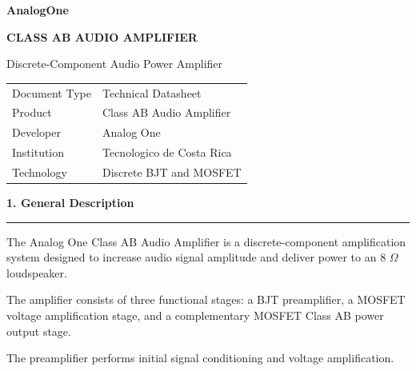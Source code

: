 \documentclass[10pt,letterpaper]{article}
\newcommand{\datasheetsection}[1]{
    \vspace{0.3cm}
    {\large\bfseries\color{datasheetblue}#1}
    \par\vspace{0.1cm}
    \hrule
    \vspace{0.15cm}
}
\begin{document}
\begin{center}

{\Large\bfseries\color{datasheetblue}
AnalogOne}

\vspace{0.3cm}

{\Huge\bfseries
CLASS AB AUDIO AMPLIFIER}

\vspace{0.2cm}

{\large
Discrete-Component Audio Power Amplifier}

\vspace{0.4cm}


\end{center}

\vspace{0.5cm}

\begin{tabular}{ll}
\hline
Document Type & Technical Datasheet\\
Product & Class AB Audio Amplifier\\
Developer & Analog One\\
Institution & Tecnologico de Costa Rica\\
Technology & Discrete BJT and MOSFET\\
\hline
\end{tabular}

\datasheetsection{1. General Description}

The Analog One Class AB Audio Amplifier is a
discrete-component amplification system designed
to increase audio signal amplitude and deliver
power to an 8 $\Omega$ loudspeaker.

The amplifier consists of three functional stages:
a BJT preamplifier, a MOSFET voltage amplification
stage, and a complementary MOSFET Class AB
power output stage.

The preamplifier performs initial signal conditioning
and voltage amplification.
\end{document}
